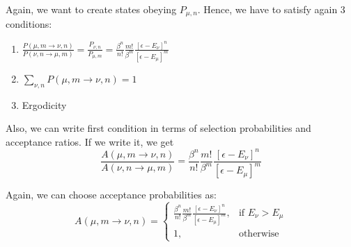 \documentclass[12pt,fleqn]{report}
\begin{document}
Again, we want to create states obeying $P_{\mu,n}$. Hence, we have to 
satisfy again 3 conditions:

\begin{enumerate}
\item $\frac{P(\mu,m \rightarrow \nu,n)}{P(\nu,n \rightarrow \mu,m)} = 
\frac{P_{\nu,n} 
}{P_{\mu,m} } = \frac{\beta^n}{n!}\frac{m!}{\beta^m}\frac{[\epsilon - 
E_\nu]^n}{[\epsilon - E_\mu]^m}$ 
\item $\sum\limits_{\nu,n} P(\mu,m \rightarrow \nu,n )  =1 $
\item Ergodicity
\end{enumerate}
Also, we can write first condition in terms of selection probabilities and 
acceptance ratios. If we write it, we get
\begin{equation}
\frac{A(\mu,m \rightarrow \nu,n)}{A(\nu,n \rightarrow \mu,m)} = 
\frac{\beta^n}{n!}\frac{m!}{\beta^m}\frac{[\epsilon - E_\nu]^n}{[\epsilon - 
E_\mu]^m}
\end{equation}

Again, we can choose acceptance probabilities as:
\[
    A(\mu,m \rightarrow \nu,n)= 
\begin{cases}
    \frac{\beta^n}{n!}\frac{m!}{\beta^m}\frac{[\epsilon - E_\nu]^n}{[\epsilon 
    - 
E_\mu]^m},& \text{if } E_\nu > E_\mu\\
    1,              & \text{otherwise}
\end{cases}
\]
\end{document}
